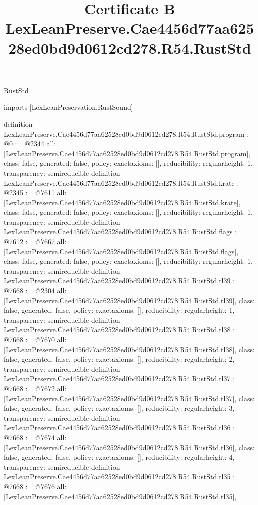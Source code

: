 \begin{lexlean}{RustStd}
\title{Certificate B LexLeanPreserve.Cae4456d77aa62528ed0bd9d0612cd278.R54.RustStd}
\begin{coremodule}
imports [LexLeanPreservation.RustSound]

definition LexLeanPreserve.Cae4456d77aa62528ed0bd9d0612cd278.R54.RustStd.program : @0 := @2344 {
  all: [LexLeanPreserve.Cae4456d77aa62528ed0bd9d0612cd278.R54.RustStd.program],
  class: false,
  generated: false,
  policy: exact{axioms: []},
  reducibility: regular{height: 1},
  transparency: semireducible
}
definition LexLeanPreserve.Cae4456d77aa62528ed0bd9d0612cd278.R54.RustStd.krate : @2345 := @7611 {
  all: [LexLeanPreserve.Cae4456d77aa62528ed0bd9d0612cd278.R54.RustStd.krate],
  class: false,
  generated: false,
  policy: exact{axioms: []},
  reducibility: regular{height: 1},
  transparency: semireducible
}
definition LexLeanPreserve.Cae4456d77aa62528ed0bd9d0612cd278.R54.RustStd.flags : @7612 := @7667 {
  all: [LexLeanPreserve.Cae4456d77aa62528ed0bd9d0612cd278.R54.RustStd.flags],
  class: false,
  generated: false,
  policy: exact{axioms: []},
  reducibility: regular{height: 1},
  transparency: semireducible
}
definition LexLeanPreserve.Cae4456d77aa62528ed0bd9d0612cd278.R54.RustStd.tl39 : @7668 := @2304 {
  all: [LexLeanPreserve.Cae4456d77aa62528ed0bd9d0612cd278.R54.RustStd.tl39],
  class: false,
  generated: false,
  policy: exact{axioms: []},
  reducibility: regular{height: 1},
  transparency: semireducible
}
definition LexLeanPreserve.Cae4456d77aa62528ed0bd9d0612cd278.R54.RustStd.tl38 : @7668 := @7670 {
  all: [LexLeanPreserve.Cae4456d77aa62528ed0bd9d0612cd278.R54.RustStd.tl38],
  class: false,
  generated: false,
  policy: exact{axioms: []},
  reducibility: regular{height: 2},
  transparency: semireducible
}
definition LexLeanPreserve.Cae4456d77aa62528ed0bd9d0612cd278.R54.RustStd.tl37 : @7668 := @7672 {
  all: [LexLeanPreserve.Cae4456d77aa62528ed0bd9d0612cd278.R54.RustStd.tl37],
  class: false,
  generated: false,
  policy: exact{axioms: []},
  reducibility: regular{height: 3},
  transparency: semireducible
}
definition LexLeanPreserve.Cae4456d77aa62528ed0bd9d0612cd278.R54.RustStd.tl36 : @7668 := @7674 {
  all: [LexLeanPreserve.Cae4456d77aa62528ed0bd9d0612cd278.R54.RustStd.tl36],
  class: false,
  generated: false,
  policy: exact{axioms: []},
  reducibility: regular{height: 4},
  transparency: semireducible
}
definition LexLeanPreserve.Cae4456d77aa62528ed0bd9d0612cd278.R54.RustStd.tl35 : @7668 := @7676 {
  all: [LexLeanPreserve.Cae4456d77aa62528ed0bd9d0612cd278.R54.RustStd.tl35],
}
\end{coremodule}
\end{lexlean}
